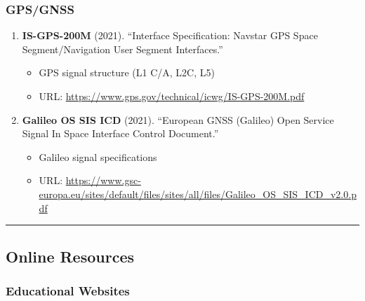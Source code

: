 \subsubsection{GPS/GNSS}\label{gpsgnss}

\begin{enumerate}
\def\labelenumi{\arabic{enumi}.}
\setcounter{enumi}{33}
\tightlist
\item
  \textbf{IS-GPS-200M} (2021). ``Interface Specification: Navstar GPS
  Space Segment/Navigation User Segment Interfaces.''

  \begin{itemize}
  \tightlist
  \item
    GPS signal structure (L1 C/A, L2C, L5)
  \item
    URL: \url{https://www.gps.gov/technical/icwg/IS-GPS-200M.pdf}
  \end{itemize}
\item
  \textbf{Galileo OS SIS ICD} (2021). ``European GNSS (Galileo) Open
  Service Signal In Space Interface Control Document.''

  \begin{itemize}
  \tightlist
  \item
    Galileo signal specifications
  \item
    URL: \url{https://www.gsc-europa.eu/sites/default/files/sites/all/files/Galileo_OS_SIS_ICD_v2.0.pdf}
  \end{itemize}
\end{enumerate}

\begin{center}\rule{0.5\linewidth}{0.5pt}\end{center}

\subsection{\texorpdfstring{Online Resources}{Online Resources}}\label{online-resources}

\subsubsection{Educational Websites}\label{educational-websites}

